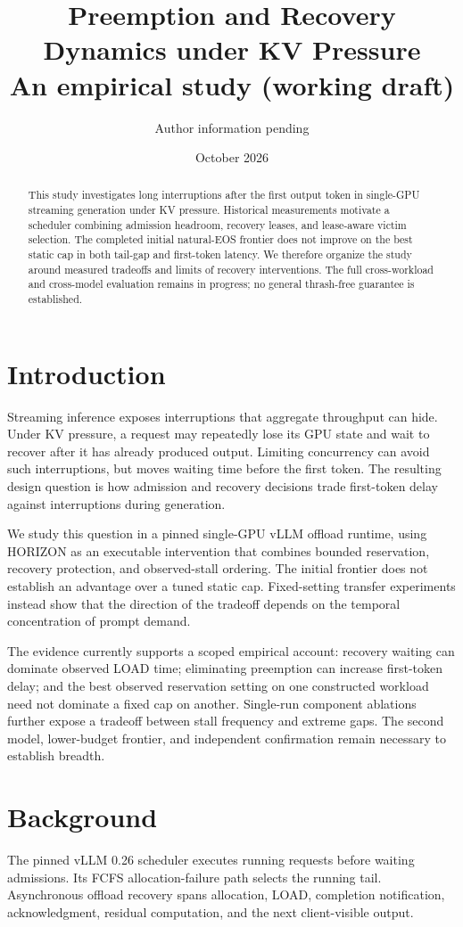 \documentclass[11pt]{article}
\title{Preemption and Recovery Dynamics under KV Pressure\\\large An empirical study (working draft)}
\author{Author information pending}
\date{October 2026}
\begin{document}
\maketitle
\begin{abstract}
This study investigates long interruptions after the first output token in
single-GPU streaming generation under KV pressure. Historical measurements
motivate a scheduler combining admission headroom, recovery leases, and
lease-aware victim selection. The completed initial natural-EOS frontier does not improve on the best
static cap in both tail-gap and first-token latency. We therefore organize
the study around measured tradeoffs and limits of recovery interventions.
The full cross-workload and cross-model evaluation remains in progress;
no general thrash-free guarantee is established.
\end{abstract}
\section{Introduction}
Streaming inference exposes interruptions that aggregate throughput can
hide. Under KV pressure, a request may repeatedly lose its GPU state and
wait to recover after it has already produced output. Limiting concurrency
can avoid such interruptions, but moves waiting time before the first token.
The resulting design question is how admission and recovery decisions
trade first-token delay against interruptions during generation.

We study this question in a pinned single-GPU vLLM offload runtime, using
HORIZON as an executable intervention that combines bounded reservation,
recovery protection, and observed-stall ordering. The initial frontier
does not establish an advantage over a tuned static cap. Fixed-setting
transfer experiments instead show that the direction of the tradeoff
depends on the temporal concentration of prompt demand.

The evidence currently supports a scoped empirical account: recovery
waiting can dominate observed LOAD time; eliminating preemption can
increase first-token delay; and the best observed reservation setting on
one constructed workload need not dominate a fixed cap on another.
Single-run component ablations further expose a tradeoff between stall
frequency and extreme gaps. The second model, lower-budget frontier,
and independent confirmation remain necessary to establish breadth.
\section{Background}
The pinned vLLM 0.26 scheduler executes running requests before waiting
admissions. Its FCFS allocation-failure path selects the running tail.
Asynchronous offload recovery spans allocation, LOAD, completion notification,
acknowledgment, residual computation, and the next client-visible output.
\end{document}

